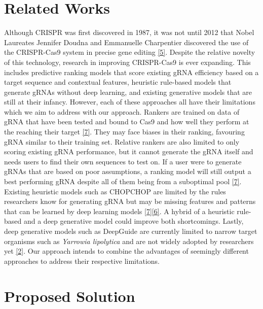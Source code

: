 \documentclass{article}
\begin{document}
\section{Related Works}
Although CRISPR was first discovered in 1987, it was not until 2012 that Nobel Laureates Jennifer Doudna and Emmanuelle Charpentier discovered the use of the CRISPR-Cas9 system in precise gene editing \hyperref[Reference 5]{[5]}. Despite the relative novelty of this technology, research in improving CRISPR-Cas9 is ever expanding. This includes predictive ranking models that score existing gRNA efficiency based on a target sequence and contextual features, heuristic rule-based models that generate gRNAs without deep learning, and existing generative models that are still at their infancy. However, each of these approaches all have their limitations which we aim to address with our approach. Rankers are trained on data of gRNA that have been tested and bound to Cas9 and how well they perform at the reaching their target \hyperref[Reference 7]{[7]}. They may face biases in their ranking, favouring gRNA similar to their training set. Relative rankers are also limited to only scoring existing gRNA performance, but it cannot generate the gRNA itself and needs users to find their own sequences to test on. If a user were to generate gRNAs that are based on poor assumptions, a ranking model will still output a best performing gRNA despite all of them being from a suboptimal pool \hyperref[Reference 7]{[7]}. Existing heuristic models such as CHOPCHOP are limited by the rules researchers know for generating gRNA but may be missing features and patterns that can be learned by deep learning models \hyperref[Reference 7]{[7]}\hyperref[Reference 6]{[6]}. A hybrid of a heuristic rule-based and a deep generative model could improve both shortcomings. Lastly, deep generative models such as DeepGuide are currently limited to narrow target organisms such as \textit{Yarrowia lipolytica} and are not widely adopted by researchers yet \hyperref[Reference 2]{[2]}. Our approach intends to combine the advantages of seemingly different approaches to address their respective limitations.



\section{Proposed Solution}
\end{document}
